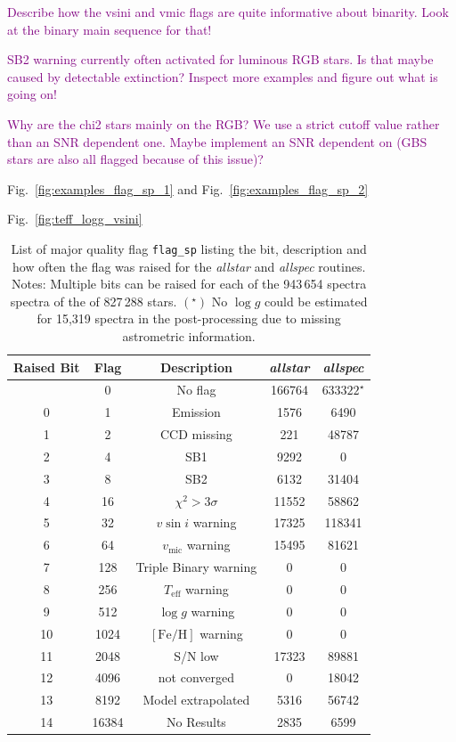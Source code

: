 \documentclass[
  journal=pasa,
  manuscript=research-paper, %
  year=2023,
  volume=37
]{cup-journal}
\newcommand{\SB}[1]{{\textcolor{purple}{#1}}}
\newcommand{\Teff}{$T_\mathrm{eff}$\xspace}
\newcommand{\logg}{$\log g$\xspace}
\newcommand{\feh}{$\mathrm{[Fe/H]}$\xspace}
\newcommand{\vmic}{$v_\mathrm{mic}$\xspace}
\newcommand{\vsini}{$v \sin i$\xspace}
\begin{document}
\SB{Describe how the vsini and vmic flags are quite informative about binarity. Look at the binary main sequence for that!}

\SB{SB2 warning currently often activated for luminous RGB stars. Is that maybe caused by detectable extinction? Inspect more examples and figure out what is going on!}

\SB{Why are the chi2 stars mainly on the RGB? We use a strict cutoff value rather than an SNR dependent one. Maybe implement an SNR dependent on (GBS stars are also all flagged because of this issue)?}

Fig.~\ref{fig:examples_flag_sp_1} and Fig.~\ref{fig:examples_flag_sp_2}

Fig.~\ref{fig:teff_logg_vsini}

\begin{table}[ht]
\centering
\caption{List of major quality flag \texttt{flag\_sp} listing the bit, description and how often the flag was raised for the \textit{allstar} and \textit{allspec} routines. Notes: Multiple bits can be raised for each of the 943\,654 spectra spectra of the  of 827\,288 stars. $(^\star)$ No \logg could be estimated for 15,319 spectra in the post-processing due to missing astrometric information.}
\label{tab:flag_sp}
\begin{tabular}{ccccc}
\hline \hline
Raised Bit & Flag & Description & \textit{allstar} & \textit{allspec} \\
\hline
 & 0 & No flag & 166764 & $\text{633322}^\star$ \\
0 & 1 & Emission & 1576 & 6490 \\
1 & 2 & CCD missing & 221 & 48787 \\
2 & 4 & SB1 & 9292 & 0 \\
3 & 8 & SB2 & 6132 & 31404 \\
4 & 16 & $\chi^2 > 3\sigma$ & 11552 & 58862 \\
5 & 32 & \vsini warning & 17325 & 118341 \\
6 & 64 & \vmic warning & 15495 & 81621 \\
7 & 128 & Triple Binary warning & 0 & 0 \\
8 & 256 & \Teff warning & 0 & 0 \\
9 & 512 & \logg warning & 0 & 0 \\
10 & 1024 & \feh warning & 0 & 0 \\
11 & 2048 & S/N low & 17323 & 89881 \\
12 & 4096 & not converged & 0 & 18042 \\
13 & 8192 & Model extrapolated & 5316 & 56742 \\
14 & 16384 & No Results & 2835 & 6599 \\
\hline
\end{tabular}
\end{table}
\end{document}
